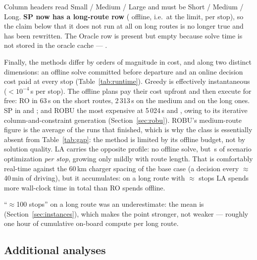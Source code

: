 

\begin{afix}
Column headers read Small / Medium / Large and must be Short / Medium / Long.
\textbf{SP now has a long-route row} ( offline, i.e.\ at the
limit,  per stop), so the claim below that it does not run at all
on long routes is no longer true and has been rewritten. The Oracle row is
present but empty because solve time is not stored in the oracle cache ---
.
\end{afix}

Finally, the methods differ by orders of magnitude in cost, and along two distinct dimensions: an offline solve committed before departure and an online decision cost paid at every stop (Table~\ref{tab:runtime}). Greedy is effectively instantaneous ($<10^{-4}$\,s per stop). The offline plans pay their cost upfront and then execute for free: RO in 63\,s on the short routes, 2\,313\,s on the medium and  on the long ones. SP in  and ; and ROBU the most expensive at 5\,024\,s and , owing to its iterative column-and-constraint generation (Section~\ref{sec:robu}).  ROBU's medium-route figure is the average of the runs that finished, which is why the class is essentially absent from Table~\ref{tab:gap}: the method is limited by its offline budget, not by solution quality.
LA carries the opposite profile: no offline solve, but \,s of scenario optimization \emph{per stop}, growing only mildly with route length. That is comfortably real-time against the 60\,km charger spacing of the base case (a decision every $\approx$40\,min of driving), but it accumulates: on a long route with $\approx$ stops LA spends more wall-clock time in total than RO spends offline.

\begin{acmt}
``$\approx$100 stops'' on a long route was an underestimate: the mean is
 (Section~\ref{sec:instances}), which makes the point stronger, not
weaker --- roughly one hour of cumulative on-board compute per long route.
\end{acmt}

\subsection{Additional analyses}
\label{sec:additional-protocol}


